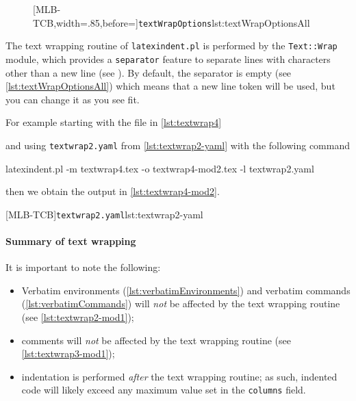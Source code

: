 
	\begin{figure}
		[MLB-TCB,width=.85\linewidth,before=\centering]{\texttt{textWrapOptions}}{lst:textWrapOptionsAll}
	\end{figure}
	The text wrapping routine of \texttt{latexindent.pl} is performed by the \texttt{Text::Wrap} module, which provides a
	\texttt{separator} feature to separate lines with characters other than a new line (see \cite{textwrap}). By default,
	the separator is empty (see \cref{lst:textWrapOptionsAll}) which means that a new line token will be used, but you can change it as you see fit.

	For example starting with the file in \cref{lst:textwrap4}

	and using \texttt{textwrap2.yaml} from \cref{lst:textwrap2-yaml} with the following command
	\begin{commandshell}
latexindent.pl -m textwrap4.tex -o textwrap4-mod2.tex -l textwrap2.yaml
\end{commandshell}
	then we obtain the output in \cref{lst:textwrap4-mod2}.

	\begin{minipage}{.45\linewidth}
	\end{minipage}
	\hfill
	\begin{minipage}{.45\linewidth}
		[MLB-TCB]{\texttt{textwrap2.yaml}}{lst:textwrap2-yaml}
	\end{minipage}

	\paragraph{Summary of text wrapping}
		It is important to note the following:
		\begin{itemize}
			\item Verbatim environments (\vref{lst:verbatimEnvironments}) and verbatim commands (\vref{lst:verbatimCommands}) will \emph{not} be affected by the text wrapping routine (see \vref{lst:textwrap2-mod1});
			\item comments will \emph{not} be affected by the text wrapping routine (see \vref{lst:textwrap3-mod1});
			\item indentation is performed \emph{after} the text wrapping routine; as such, indented code
			      will likely exceed any maximum value set in the \texttt{columns} field.
		\end{itemize}

